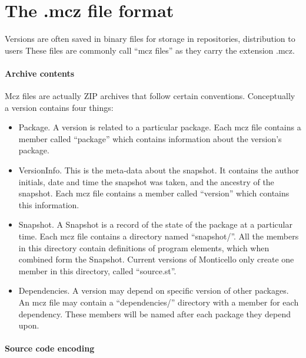 \documentclass[a4paper,10pt,twoside]{book}
\begin{document}

\section{The .mcz file format}

Versions are often  saved in binary files for storage in repositories, distribution to users \etc
These files are commonly call ``mcz files'' as they carry the extension .mcz.

\paragraph{Archive contents}

Mcz files are actually ZIP archives that follow certain conventions. Conceptually a version contains four things:

\begin{itemize}
\item Package. A version is related to a particular package. Each mcz file contains a member called ``package'' which contains information about the version's package.

\item VersionInfo. This is the meta-data about the snapshot. It contains the author initials, date and time the snapshot was taken, and the ancestry of the snapshot. Each mcz file contains a member called ``version'' which contains this information.
\item Snapshot. A Snapshot is a record of the state of the package at a particular time. Each mcz file contains a directory named ``snapshot/''. All the members in this directory contain definitions of program elements, which when combined form the Snapshot. Current versions of Monticello only create one member in this directory, called ``source.st''.
\item Dependencies. A version may depend on specific version of other packages. An mcz file may contain a ``dependencies/'' directory with a member for each dependency. These members will be named after each package they  depend upon.
\end{itemize}

\paragraph{Source code encoding}
\end{document}
